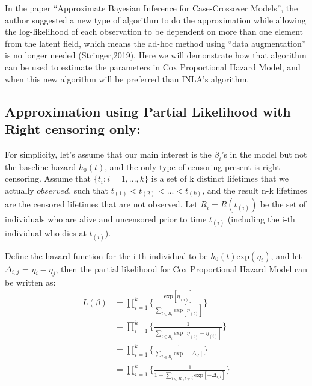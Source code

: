\documentclass[]{article}
\begin{document}
In the paper ``Approximate Bayesian Inference for Case-Crossover
Models'', the author suggested a new type of algorithm to do the
approximation while allowing the log-likelihood of each observation to
be dependent on more than one element from the latent field, which means
the ad-hoc method using ``data augmentation'' is no longer needed
(Stringer,2019). Here we will demonstrate how that algorithm can be used
to estimate the parameters in Cox Proportional Hazard Model, and when
this new algorithm will be preferred than INLA's algorithm.

\hypertarget{approximation-using-partial-likelihood-with-right-censoring-only}{%
\subsection{Approximation using Partial Likelihood with Right censoring
only:}\label{approximation-using-partial-likelihood-with-right-censoring-only}}

For simplicity, let's assume that our main interest is the \(\beta_i\)'s
in the model but not the baseline hazard \(h_0(t)\), and the only type
of censoring present is right-censoring. Assume that
\(\{t_i:i=1,...,k\}\) is a set of k distinct lifetimes that we actually
\(observed\), such that \(t_{(1)} < t_{(2)} < ... <t_{(k)}\), and the
result n-k lifetimes are the censored lifetimes that are not observed.
Let \(R_i = R(t_{(i)})\) be the set of individuals who are alive and
uncensored prior to time \(t_{(i)}\) (including the i-th individual who
dies at \(t_{(i)}\)).

Define the hazard function for the i-th individual to be
\(h_0(t)\text{exp}(\eta_i)\), and let \(\Delta_{i,j}\) =
\(\eta_i -\eta_j\), then the partial likelihood for Cox Proportional
Hazard Model can be written as:
\begin{equation}\begin{aligned}\label{eqn:partial}
L(\beta) &= \prod_{i=1}^{k} \bigg\{\frac{\text{exp}[\eta_{(i)}]}{{\sum_{l\in R_i}^{}\text{exp}[\eta_{(l)}]}}\bigg \} \\
         &= \prod_{i=1}^{k} \bigg\{\frac{1}{{\sum_{l\in R_i}^{}\text{exp}[\eta_{(l)}-\eta_{(i)}]}}\bigg \} \\
         &= \prod_{i=1}^{k} \bigg\{\frac{1}{{\sum_{l\in R_i}^{}\text{exp}[-\Delta_{il}]}}\bigg \} \\
         &= \prod_{i=1}^{k} \bigg\{\frac{1}{{1 + \sum_{l\in R_i , l \neq i}^{}\text{exp}[-\Delta_{i,l}]}}\bigg \} \\
\end{aligned}\end{equation}
\end{document}
